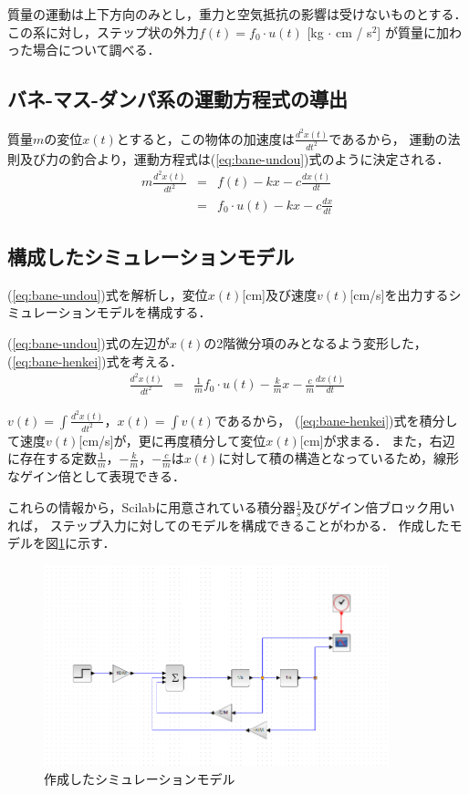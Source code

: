 \documentclass[dvipdfmx,titlepage,a4j]{jsarticle}  %
\begin{document}
質量の運動は上下方向のみとし，重力と空気抵抗の影響は受けないものとする．
この系に対し，ステップ状の外力$f(t) = f_0 \cdot u(t)$ [kg $\cdot$ cm / s$^2$]
が質量に加わった場合について調べる．

\subsection{バネ-マス-ダンパ系の運動方程式の導出}
質量$m$の変位$x(t)$とすると，この物体の加速度は$\frac{d^2x(t)}{dt^2}$であるから，
運動の法則及び力の釣合より，運動方程式は(\ref{eq:bane-undou})式のように決定される．
\begin{eqnarray}
  m \frac{d^2x(t)}{dt^2} &=& f(t) - kx - c \frac{dx(t)}{dt} \nonumber \\
  &=& f_0 \cdot u(t) - kx - c \frac{dx}{dt} \label{eq:bane-undou}
\end{eqnarray}

\subsection{構成したシミュレーションモデル}

(\ref{eq:bane-undou})式を解析し，変位$x(t)$[cm]及び速度$v(t)$[cm/s]を出力するシミュレーションモデルを構成する．

(\ref{eq:bane-undou})式の左辺が$x(t)$の2階微分項のみとなるよう変形した，(\ref{eq:bane-henkei})式を考える．
\begin{eqnarray}
  \frac{d^2x(t)}{dt^2} &=&  \frac{1}{m} f_0 \cdot u(t) - \frac{k}{m} x - \frac{c}{m} \frac{dx(t)}{dt} \label{eq:bane-henkei}
\end{eqnarray}

$v(t) = \int \frac{d^2x(t)}{dt^2}$，$x(t) = \int v(t)$であるから，
(\ref{eq:bane-henkei})式を積分して速度$v(t)$[cm/s]が，更に再度積分して変位$x(t)$[cm]が求まる．
また，右辺に存在する定数$\frac{1}{m}$，$- \frac{k}{m}$，$- \frac{c}{m}$は$x(t)$に対して積の構造となっているため，線形なゲイン倍として表現できる．

これらの情報から，Scilabに用意されている積分器$\frac{1}{s}$及びゲイン倍ブロック用いれば，
ステップ入力に対してのモデルを構成できることがわかる．
作成したモデルを図\ref{fig:bane-model.png}に示す．

\begin{figure}[H]
  \centering
  \includegraphics[width=10cm]{../graph/bane-model.png}
  \caption{作成したシミュレーションモデル}
  \label{fig:bane-model.png}
\end{figure}
\end{document}
